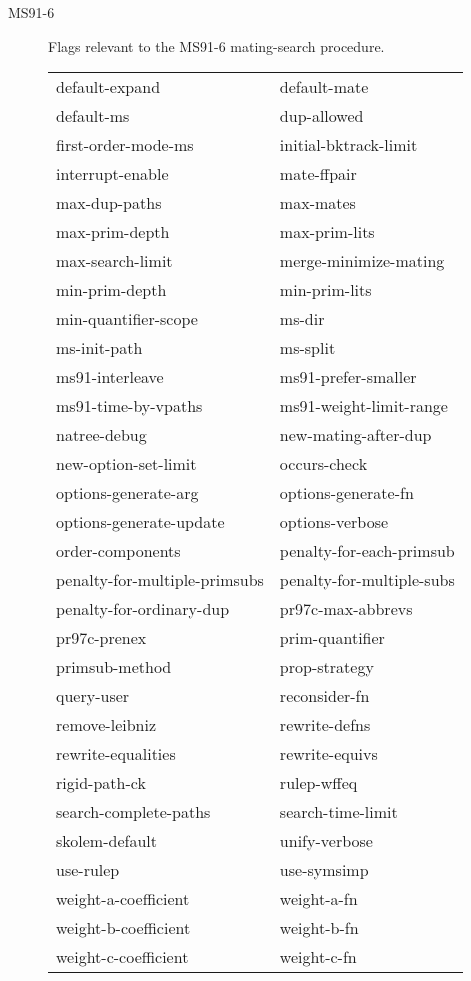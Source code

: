 \begin{description} 
\item[MS91-6]  
Flags relevant to the MS91-6 mating-search procedure.

\begin{tabular}{l l}
default-expand&default-mate\\
default-ms&dup-allowed\\
first-order-mode-ms&initial-bktrack-limit\\
interrupt-enable&mate-ffpair\\
max-dup-paths&max-mates\\
max-prim-depth&max-prim-lits\\
max-search-limit&merge-minimize-mating\\
min-prim-depth&min-prim-lits\\
min-quantifier-scope&ms-dir\\
ms-init-path&ms-split\\
ms91-interleave&ms91-prefer-smaller\\
ms91-time-by-vpaths&ms91-weight-limit-range\\
natree-debug&new-mating-after-dup\\
new-option-set-limit&occurs-check\\
options-generate-arg&options-generate-fn\\
options-generate-update&options-verbose\\
order-components&penalty-for-each-primsub\\
penalty-for-multiple-primsubs&penalty-for-multiple-subs\\
penalty-for-ordinary-dup&pr97c-max-abbrevs\\
pr97c-prenex&prim-quantifier\\
primsub-method&prop-strategy\\
query-user&reconsider-fn\\
remove-leibniz&rewrite-defns\\
rewrite-equalities&rewrite-equivs\\
rigid-path-ck&rulep-wffeq\\
search-complete-paths&search-time-limit\\
skolem-default&unify-verbose\\
use-rulep&use-symsimp\\
weight-a-coefficient&weight-a-fn\\
weight-b-coefficient&weight-b-fn\\
weight-c-coefficient&weight-c-fn\\
\end{tabular}


\end{description}
